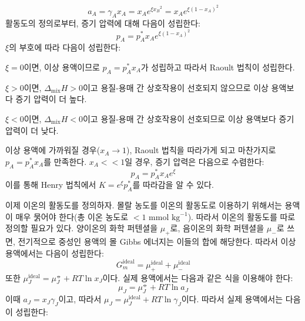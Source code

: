         \begin{equation*}
            a_A = \gamma_A x_A = x_A e^{\xi {x_B}^2}=x_A e^{\xi \left(1-x_A\right)^2}
        \end{equation*}
        활동도의 정의로부터, 증기 압력에 대해 다음이 성립한다:
        \begin{equation*}
            p_A = p_A^\ast x_A e^{\xi\left(1-x_A\right)^2}
        \end{equation*}
        $\xi$의 부호에 따라 다음이 성립한다:
        \begin{enum}
            \item $\xi=0$이면, 이상 용액이므로 $p_A = p_A^\ast x_A$가 성립하고 따라서 Raoult 법칙이 성립한다.
            \item $\xi>0$이면, $\Delta_\mathrm{mix}H > 0$이고 용질-용매 간 상호작용이 선호되지 않으므로 이상 용액보다 증기 압력이 더 높다. 
            \item $\xi<0$이면, $\Delta_\mathrm{mix}H<0$이고 용질-용매 간 상호작용이 선호되므로 이상 용액보다 증기 압력이 더 낮다. 
        \end{enum}
        이상 용액에 가까워질 경우($x_A\rightarrow 1$), Raoult 법칙을 따라가게 되고 마찬가지로 $p_A = p_A^\ast x_A$를 만족한다. 
        $x_A <\!< 1$일 경우, 증기 압력은 다음으로 수렴한다:
        \begin{equation*}
            p_A = p_A^\ast x_A e^\xi
        \end{equation*}
        이를 통해 Henry 법칙에서 $K=e^\xi p_A^\ast$를 따라감을 알 수 있다.
        \par 이제 이온의 활동도를 정의하자. 몰랄 농도를 이온의 활동도로 이용하기 위해서는 용액이 매우 묽어야 한다(총 이온 농도로 $<1\textrm{ mmol kg}^{-1}$). 
        따라서 이온의 활동도를 따로 정의할 필요가 있다. 양이온의 화학 퍼텐셜을 $\mu_{+}$로, 음이온의 화학 퍼텐셜을 $\mu_{-}$로 쓰면, 
        전기적으로 중성인 용액의 몰 Gibbs 에너지는 이들의 합에 해당한다. 따라서 이상 용액에서는 다음이 성립한다:
        \begin{equation*}
            G_m^{\mathrm{ideal}}=\mu_{+}^\mathrm{ideal}+\mu_{-}^\mathrm{ideal}
        \end{equation*}
        또한 $\mu_J^\mathrm{ideal}=\mu_J^\circlehbar + RT\ln{x_J}$이다. 실제 용액에서는 다음과 같은 식을 이용해야 한다:
        \begin{equation*}
            \mu_J = \mu_J^\circlehbar + RT\ln{a_J}
        \end{equation*}
        이때 $a_J = x_J \gamma_J$이고, 따라서 $\mu_J = \mu_J^\mathrm{ideal}+RT\ln{\gamma_J}$이다. 따라서 실제 용액에서는 다음이 성립한다:
